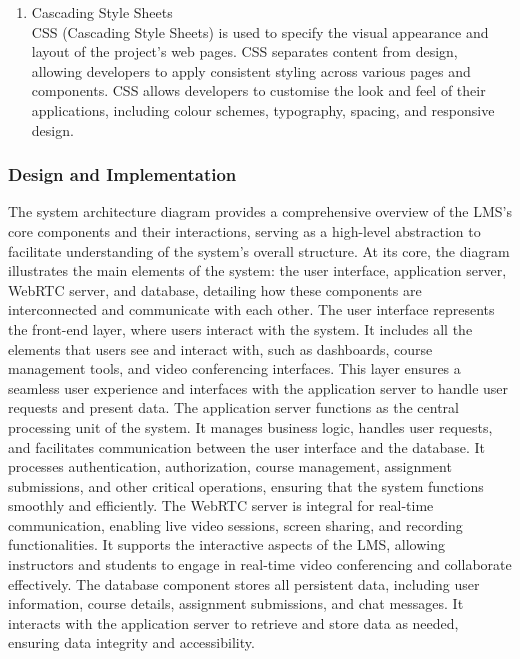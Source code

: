 \documentclass[a4paper,12pt]{article}  %
\begin{document}
\begin{enumerate}
      \item Cascading Style Sheets\\ CSS (Cascading Style Sheets) is used to specify the
            visual appearance and layout of the project's web pages. CSS separates content
            from design, allowing developers to apply consistent styling across various
            pages and components. CSS allows developers to customise the look and feel of
            their applications, including colour schemes, typography, spacing, and
            responsive design\cite{w3schools2024css}.\\
\end{enumerate}

\subsubsection{Design and Implementation}
The system architecture diagram provides a comprehensive overview of the LMS's
core components and their interactions, serving as a high-level abstraction to
facilitate understanding of the system's overall structure. At its core, the
diagram illustrates the main elements of the system: the user interface,
application server, WebRTC server, and database, detailing how these components
are interconnected and communicate with each other. The user interface
represents the front-end layer, where users interact with the system. It
includes all the elements that users see and interact with, such as dashboards,
course management tools, and video conferencing interfaces. This layer ensures
a seamless user experience and interfaces with the application server to handle
user requests and present data. The application server functions as the central
processing unit of the system. It manages business logic, handles user
requests, and facilitates communication between the user interface and the
database. It processes authentication, authorization, course management,
assignment submissions, and other critical operations, ensuring that the system
functions smoothly and efficiently. The WebRTC server is integral for real-time
communication, enabling live video sessions, screen sharing, and recording
functionalities. It supports the interactive aspects of the LMS, allowing
instructors and students to engage in real-time video conferencing and
collaborate effectively. The database component stores all persistent data,
including user information, course details, assignment submissions, and chat
messages. It interacts with the application server to retrieve and store data
as needed, ensuring data integrity and accessibility.\\
\end{document}

